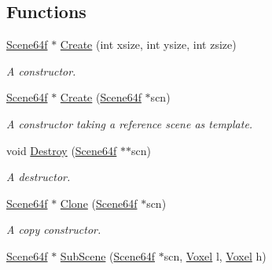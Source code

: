 \subsection*{Functions}
\begin{DoxyCompactItemize}
\item 
\hyperlink{namespacegft_1_1Scene64f_a512a42827b5e024a75792dd3e6fca5eb}{Scene64f} $\ast$ \hyperlink{namespacegft_1_1Scene64f_af810a761c5a89ddbb834014330788467}{Create} (int xsize, int ysize, int zsize)
\begin{DoxyCompactList}\small\item\em A constructor. \end{DoxyCompactList}\item 
\hyperlink{namespacegft_1_1Scene64f_a512a42827b5e024a75792dd3e6fca5eb}{Scene64f} $\ast$ \hyperlink{namespacegft_1_1Scene64f_aced25db50152e921318a249f0cbc533d}{Create} (\hyperlink{namespacegft_1_1Scene64f_a512a42827b5e024a75792dd3e6fca5eb}{Scene64f} $\ast$scn)
\begin{DoxyCompactList}\small\item\em A constructor taking a reference scene as template. \end{DoxyCompactList}\item 
void \hyperlink{namespacegft_1_1Scene64f_a98c25c3e975da061bb60dfb7a86b876b}{Destroy} (\hyperlink{namespacegft_1_1Scene64f_a512a42827b5e024a75792dd3e6fca5eb}{Scene64f} $\ast$$\ast$scn)
\begin{DoxyCompactList}\small\item\em A destructor. \end{DoxyCompactList}\item 
\hyperlink{namespacegft_1_1Scene64f_a512a42827b5e024a75792dd3e6fca5eb}{Scene64f} $\ast$ \hyperlink{namespacegft_1_1Scene64f_a4a534a804ab259a05f0a38b23cd706ed}{Clone} (\hyperlink{namespacegft_1_1Scene64f_a512a42827b5e024a75792dd3e6fca5eb}{Scene64f} $\ast$scn)
\begin{DoxyCompactList}\small\item\em A copy constructor. \end{DoxyCompactList}\item 
\hyperlink{namespacegft_1_1Scene64f_a512a42827b5e024a75792dd3e6fca5eb}{Scene64f} $\ast$ \hyperlink{namespacegft_1_1Scene64f_a35f3a9b43c5e38cd481e366699197491}{Sub\-Scene} (\hyperlink{namespacegft_1_1Scene64f_a512a42827b5e024a75792dd3e6fca5eb}{Scene64f} $\ast$scn, \hyperlink{namespacegft_a16db894075bb714f877a3c5733772db6}{Voxel} l, \hyperlink{namespacegft_a16db894075bb714f877a3c5733772db6}{Voxel} h)
$$
\end{DoxyCompactItemize}

